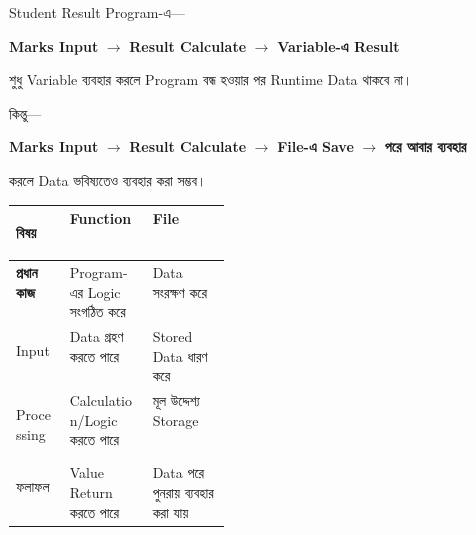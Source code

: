 

Student Result Program-এ—

\begin{center}

\textbf{Marks Input}
\(\longrightarrow\)
\textbf{Result Calculate}
\(\longrightarrow\)
\textbf{Variable-এ Result}

\end{center}

শুধু Variable ব্যবহার করলে Program বন্ধ হওয়ার পর Runtime Data থাকবে না।

কিন্তু—

\begin{center}

\textbf{Marks Input}
\(\longrightarrow\)
\textbf{Result Calculate}
\(\longrightarrow\)
\textbf{File-এ Save}
\(\longrightarrow\)
\textbf{পরে আবার ব্যবহার}

\end{center}

করলে Data ভবিষ্যতেও ব্যবহার করা সম্ভব।



\begin{tabularx}
{\linewidth}
{
|>{\bfseries\RaggedRight\arraybackslash}p{0.25\linewidth}
|Y
|Y|
}

\hline
{}

\textbf{বিষয়}
&
\textbf{Function}
&
\textbf{File}
\\
\hline

প্রধান কাজ
&
Program-এর Logic সংগঠিত করে
&
Data সংরক্ষণ করে
\\
\hline

Input
&
Data গ্রহণ করতে পারে
&
Stored Data ধারণ করে
\\
\hline

Processing
&
Calculation/Logic করতে পারে
&
মূল উদ্দেশ্য Storage
\\
\hline

ফলাফল
&
Value Return করতে পারে
&
Data পরে পুনরায় ব্যবহার করা যায়
\\
\hline

\end{tabularx}

